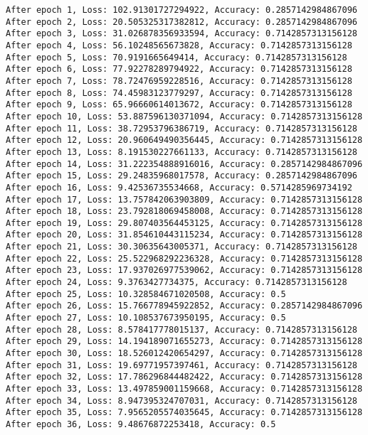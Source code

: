 \documentclass[11pt]{article}
\begin{document}
    \begin{Verbatim}[commandchars=\\\{\}]
After epoch 1, Loss: 102.91301727294922, Accuracy: 0.2857142984867096
After epoch 2, Loss: 20.505325317382812, Accuracy: 0.2857142984867096
After epoch 3, Loss: 31.026878356933594, Accuracy: 0.7142857313156128
After epoch 4, Loss: 56.10248565673828, Accuracy: 0.7142857313156128
After epoch 5, Loss: 70.9191665649414, Accuracy: 0.7142857313156128
After epoch 6, Loss: 77.92278289794922, Accuracy: 0.7142857313156128
After epoch 7, Loss: 78.72476959228516, Accuracy: 0.7142857313156128
After epoch 8, Loss: 74.45983123779297, Accuracy: 0.7142857313156128
After epoch 9, Loss: 65.96660614013672, Accuracy: 0.7142857313156128
After epoch 10, Loss: 53.887596130371094, Accuracy: 0.7142857313156128
After epoch 11, Loss: 38.72953796386719, Accuracy: 0.7142857313156128
After epoch 12, Loss: 20.960649490356445, Accuracy: 0.7142857313156128
After epoch 13, Loss: 8.191530227661133, Accuracy: 0.7142857313156128
After epoch 14, Loss: 31.222354888916016, Accuracy: 0.2857142984867096
After epoch 15, Loss: 29.24835968017578, Accuracy: 0.2857142984867096
After epoch 16, Loss: 9.42536735534668, Accuracy: 0.5714285969734192
After epoch 17, Loss: 13.757842063903809, Accuracy: 0.7142857313156128
After epoch 18, Loss: 23.792818069458008, Accuracy: 0.7142857313156128
After epoch 19, Loss: 29.807403564453125, Accuracy: 0.7142857313156128
After epoch 20, Loss: 31.854610443115234, Accuracy: 0.7142857313156128
After epoch 21, Loss: 30.30635643005371, Accuracy: 0.7142857313156128
After epoch 22, Loss: 25.522968292236328, Accuracy: 0.7142857313156128
After epoch 23, Loss: 17.937026977539062, Accuracy: 0.7142857313156128
After epoch 24, Loss: 9.3763427734375, Accuracy: 0.7142857313156128
After epoch 25, Loss: 10.328584671020508, Accuracy: 0.5
After epoch 26, Loss: 15.766778945922852, Accuracy: 0.2857142984867096
After epoch 27, Loss: 10.108537673950195, Accuracy: 0.5
After epoch 28, Loss: 8.578417778015137, Accuracy: 0.7142857313156128
After epoch 29, Loss: 14.194189071655273, Accuracy: 0.7142857313156128
After epoch 30, Loss: 18.526012420654297, Accuracy: 0.7142857313156128
After epoch 31, Loss: 19.69771957397461, Accuracy: 0.7142857313156128
After epoch 32, Loss: 17.786296844482422, Accuracy: 0.7142857313156128
After epoch 33, Loss: 13.497859001159668, Accuracy: 0.7142857313156128
After epoch 34, Loss: 8.947395324707031, Accuracy: 0.7142857313156128
After epoch 35, Loss: 7.9565205574035645, Accuracy: 0.7142857313156128
After epoch 36, Loss: 9.48676872253418, Accuracy: 0.5

\end{Verbatim}
\end{document}
